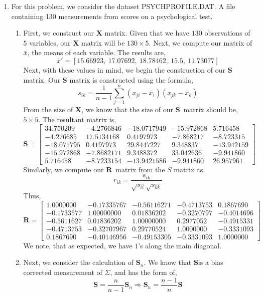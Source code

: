 \documentclass[letterpaper,10pt]{article}
\newcommand{\X}{$\textbf{X}$}
\newcommand{\eS}{$\textbf{S}$}
\newcommand{\Sn}{$\textbf{S}_n$}
\newcommand{\R}{$\textbf{R}$}
\begin{document}
\begin{enumerate}
\item For this problem, we consider the dataset PSYCHPROFILE.DAT. A file containing 130 measurements from scores on a psychological test.
\begin{enumerate}
\item First, we construct our $\textbf{X}$ matrix. Given that we have $130$ observations of $5$ variables, our $\textbf{X}$ matrix will be $130\times 5$. Next, we compute our matrix of $\bar{x}$, the means of each variable. The results are,
\[\bar{x}'=\left[15.66923,\ 17.07692,\ 18.78462,\ 15.5,\ 11.73077\right]\]
Next, with these values in mind, we begin the construction of our \eS matrix. Our $\textbf{S}$ matrix is constructed using the formula,
\[s_{ik}=\frac{1}{n-1}\sum_{j=1}^n(x_{ji}-\bar{x}_i)(x_{jk}-\bar{x}_k)\]
From the size of \X , we know that the size of our \eS \ matrix should be, $5\times 5$. The resultant matrix is,
\[\textbf{S}=\begin{bmatrix}
34.750209 & -4.2766846 & -18.0717949 & -15.972868   & 5.716458\\
-4.276685 & 17.5134168   & 0.4197973  & -7.868217 &  -8.723315\\
-18.071795 &  0.4197973 &  29.8447227 &   9.348837 & -13.942159\\
-15.972868 &  -7.8682171 &   9.3488372  & 33.042636  & -9.941860\\
5.716458 &  -8.7233154 & -13.9421586 &   -9.941860 &   26.957961
\end{bmatrix} \]
Similarly, we compute our \R \ matrix from the $S$ matrix as,
\[r_{ik}=\frac{s_{ik}}{\sqrt{s_{ii}}\sqrt{s_{kk}}}\]
Thus,
\[\textbf{R}=\begin{bmatrix}
1.0000000 & -0.17335767 & -0.56116271 & -0.4713753  & 0.1867690\\
-0.1733577  & 1.00000000  & 0.01836202 & -0.3270797 & -0.4014696\\
-0.5611627  & 0.01836202  & 1.00000000  & 0.2977052 & -0.4915331\\
-0.4713753 & -0.32707967  & 0.29770524  & 1.0000000 & -0.3331093\\
0.1867690 & -0.40146956 & -0.49153305 & -0.3331093  & 1.0000000
\end{bmatrix} \]
We note, that as expected, we have $1$'s along the main diagonal.
\item Next, we consider the calculation of \Sn . We know that \eS is a bias corrected measurement of \textbf{$\Sigma$}, and has the form of,
\[\textbf{S}=\frac{n}{n-1}\textbf{S}_n\Rightarrow \textbf{S}_n = \frac{n-1}{n}\textbf{S}\]

\end{enumerate}
\end{enumerate}
\end{document}
